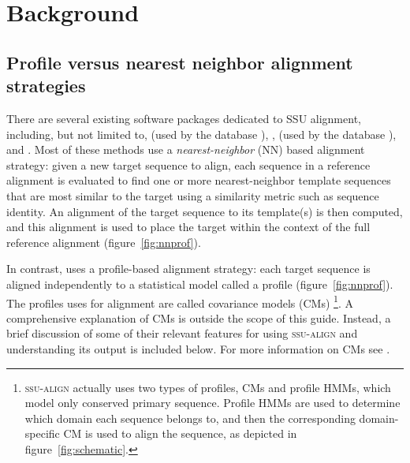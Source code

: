 \section{Background}
\label{sec:background}


\subsection{Profile versus nearest neighbor alignment strategies}

There are several existing software packages dedicated to
SSU alignment, including, but not limited to, 
\cite{DeSantis06} (used by the  database
\cite{DeSantis06a}),  \cite{Caporaso10},
 (used by the  database
\cite{Pruesse07}), and  \cite{Schloss09}.
Most of these methods use a \emph{nearest-neighbor}
(NN) based alignment strategy: given a new target sequence to align,
each sequence in a reference alignment is evaluated to find one or
more nearest-neighbor template sequences that are most similar to the
target using a similarity metric such as sequence identity. An
alignment of the target sequence to its template(s) is then
computed, and this alignment is used to place the target within the
context of the full reference alignment (figure~\ref{fig:nnprof}).

In contrast,  uses a profile-based alignment
strategy: each target sequence is aligned independently to a
statistical model called a profile
(figure~\ref{fig:nnprof}). The profiles  uses for
alignment are called covariance models (CMs)
\footnote{\textsc{ssu-align} actually uses two types of profiles,
  CMs and profile HMMs, which model only conserved primary
  sequence. Profile HMMs are used to determine which domain each
  sequence belongs to, and then the corresponding domain-specific CM
  is used to align the sequence, as depicted in
  figure~\ref{fig:schematic}.}.
A comprehensive explanation of CMs is outside the scope of this
guide. Instead, a brief discussion of some of their relevant features
for using \textsc{ssu-align} and understanding its output is included
below. For more information on CMs see
\cite{Eddy94,Durbin98,Eddy02b,NawrockiEddy07,Nawrocki09,Nawrocki09b,KolbeEddy09}.

